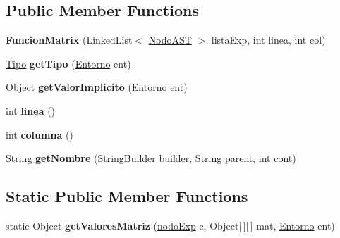 \subsection*{Public Member Functions}
\begin{DoxyCompactItemize}
\item 
\mbox{\label{classast_1_1instrucciones_1_1funciones_1_1_funcion_matrix_a9607ad469eb52695322450a2ce4fbd9a}} 
{\bfseries Funcion\+Matrix} (Linked\+List$<$ \mbox{\hyperlink{interfaceast_1_1_nodo_a_s_t}{Nodo\+A\+ST}} $>$ lista\+Exp, int linea, int col)
\item 
\mbox{\label{classast_1_1instrucciones_1_1funciones_1_1_funcion_matrix_ac97af3af5a2efa36a97433fc7333e5e0}} 
\mbox{\hyperlink{classentorno_1_1_tipo}{Tipo}} {\bfseries get\+Tipo} (\mbox{\hyperlink{classentorno_1_1_entorno}{Entorno}} ent)
\item 
\mbox{\label{classast_1_1instrucciones_1_1funciones_1_1_funcion_matrix_a59e1e6f1d5fb6cbce7d2f337a8cc23df}} 
Object {\bfseries get\+Valor\+Implicito} (\mbox{\hyperlink{classentorno_1_1_entorno}{Entorno}} ent)
\item 
\mbox{\label{classast_1_1instrucciones_1_1funciones_1_1_funcion_matrix_ada402920e5404210f498dd5f8a43c32d}} 
int {\bfseries linea} ()
\item 
\mbox{\label{classast_1_1instrucciones_1_1funciones_1_1_funcion_matrix_a42e623f3e0289b04c2383d2a35b06a6b}} 
int {\bfseries columna} ()
\item 
\mbox{\label{classast_1_1instrucciones_1_1funciones_1_1_funcion_matrix_addd2b583e2cbe14c8b1d7f578dd6ae31}} 
String {\bfseries get\+Nombre} (String\+Builder builder, String parent, int cont)
\end{DoxyCompactItemize}
\subsection*{Static Public Member Functions}
\begin{DoxyCompactItemize}
\item 
\mbox{\label{classast_1_1instrucciones_1_1funciones_1_1_funcion_matrix_a648bcda532036979d24215c3b7b4bdd4}} 
static Object {\bfseries get\+Valores\+Matriz} (\mbox{\hyperlink{classentorno_1_1nodo_exp}{nodo\+Exp}} e, Object\mbox{[}$\,$\mbox{]}\mbox{[}$\,$\mbox{]} mat, \mbox{\hyperlink{classentorno_1_1_entorno}{Entorno}} ent)
\end{DoxyCompactItemize}


